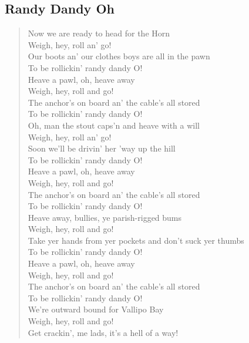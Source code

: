 \documentclass[11pt]{article}
\begin{document}
\subsection{Randy Dandy Oh}
\label{sec:org9fb268a}
\begin{verse}
Now we are ready to head for the Horn\\
Weigh, hey, roll an' go!\\
Our boots an' our clothes boys are all in the pawn\\
To be rollickin' randy dandy O!\\
\vspace*{1em}
Heave a pawl, oh, heave away\\
Weigh, hey, roll and go!\\
The anchor's on board an' the cable's all stored\\
To be rollickin' randy dandy O!\\
\vspace*{1em}
Oh, man the stout caps'n and heave with a will\\
Weigh, hey, roll an' go!\\
Soon we'll be drivin' her 'way up the hill\\
To be rollickin' randy dandy O!\\
Heave a pawl, oh, heave away\\
Weigh, hey, roll and go!\\
The anchor's on board an' the cable's all stored\\
To be rollickin' randy dandy O!\\
\vspace*{1em}
Heave away, bullies, ye parish-rigged bums\\
Weigh, hey, roll and go!\\
Take yer hands from yer pockets and don't suck yer thumbs\\
To be rollickin' randy dandy O!\\
\vspace*{1em}
Heave a pawl, oh, heave away\\
Weigh, hey, roll and go!\\
The anchor's on board an' the cable's all stored\\
To be rollickin' randy dandy O!\\
\vspace*{1em}
We're outward bound for Vallipo Bay\\
Weigh, hey, roll and go!\\
Get crackin', me lads, it's a hell of a way!\\

\end{verse}
\end{document}
